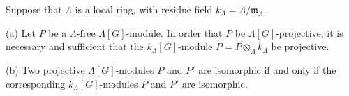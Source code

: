 Suppose that $\Lambda$ is a local ring, with residue field $k_{\Lambda} = \Lambda/\mathfrak{m}_{\Lambda}$.

(a) Let $P$ be a $\Lambda$-free $\Lambda[G]$-module. In order that $P$ be $\Lambda[G]$-projective, it is necessary and sufficient that the $k_{\Lambda}[G]$-module $\bar{P} = P \otimes_{\Lambda} k_{\Lambda}$ be projective.

(b) Two projective $\Lambda[G]$-modules $P$ and $P'$ are isomorphic if and only if the corresponding $k_{\Lambda}[G]$-modules $\bar{P}$ and $\bar{P}'$ are isomorphic.
